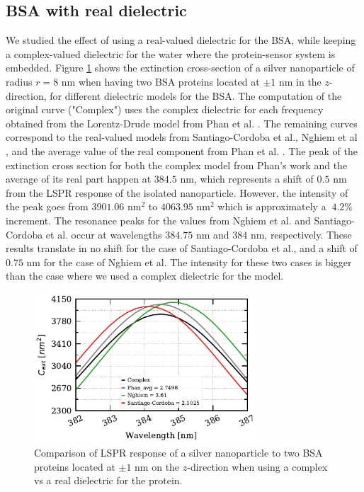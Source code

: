 \subsection{BSA with real dielectric}

We studied the effect of using a real-valued dielectric for the BSA, while keeping a complex-valued dielectric for the water where  
the protein-sensor system is embedded. Figure \ref{fig:bsa_diel} shows the extinction cross-section of a silver nanoparticle 
of radius $r=8$ nm when having two BSA proteins located at $\pm1$ nm in the $z$-direction, for different dielectric models for the BSA. 
The computation of the original curve ("Complex") uses the complex dielectric for each frequency obtained from the Lorentz-Drude model 
from Phan et al. \cite{PhanETal2013}. The remaining curves correspond to the real-valued models from Santiago-Cordoba et al.\cite{SantiagoCordobaETal2011},
Nghiem et al \cite{NghiemETal2012}, and the average value of the real component from Phan et al. \cite{PhanETal2013}. The peak of the extinction cross section 
for both the complex model from Phan's work \cite{PhanETal2013} and the average of its real part happen at $384.5$ nm, which represents a shift of $0.5$ nm from 
the LSPR response of the isolated nanoparticle. However, the intensity of the peak goes from $3901.06$ nm$^2$ to $4063.95$ nm$^2$ which is approximately a $~4.2\%$ increment. 
The resonance peaks for the values from Nghiem et al. and Santiago-Cordoba et al. occur at wavelengths $384.75$ nm and $384$ nm, respectively. These results 
translate in no shift for the case of Santiago-Cordoba et al., and a shift of $0.75$ nm for the case of Nghiem et al. The intensity for these two cases is 
bigger than the case where we used a complex dielectric for the model. 

\begin{figure} %
    \centering
    \includegraphics[width=0.75\textwidth]{bsa_diel_study.pdf} 
    \caption{Comparison of LSPR response of a silver nanoparticle to two BSA proteins located at $\pm1$ nm on the $z$-direction
    when using a complex vs a real dielectric for the protein.}
    \label{fig:bsa_diel}
 \end{figure}

